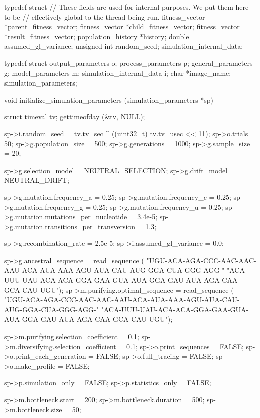 \documentclass{article}
\begin{document}
\begin{ccode}
typedef struct {
  // These fields are used for internal purposes. We put them here to be
  // effectively global to the thread being run.
  fitness_vector	*parent_fitness_vector;
  fitness_vector	*child_fitness_vector;
  fitness_vector	*result_fitness_vector;
  population_history	*history;
  double		assumed_gl_variance;
  unsigned int		random_seed;
} simulation_internal_data;

typedef struct {
  output_parameters		o;
  process_parameters		p;
  general_parameters		g;
  model_parameters		m;
  simulation_internal_data	i;
  char				*image_name;
} simulation_parameters;

void initialize_simulation_parameters (simulation_parameters *sp) {
  struct timeval tv;
  gettimeofday (&tv, NULL);

  sp->i.random_seed                     	= tv.tv_sec ^ ((uint32_t) tv.tv_usec << 11);
  sp->o.trials                     		= 50;
  sp->g.population_size				= 500;
  sp->g.generations				= 1000;
  sp->g.sample_size				= 20;

  sp->g.selection_model				= NEUTRAL_SELECTION;
  sp->g.drift_model				= NEUTRAL_DRIFT;

  sp->g.mutation.frequency_a			= 0.25;
  sp->g.mutation.frequency_c			= 0.25;
  sp->g.mutation.frequency_g			= 0.25;
  sp->g.mutation.frequency_u			= 0.25;
  sp->g.mutation.mutations_per_nucleotide	= 3.4e-5;
  sp->g.mutation.transitions_per_transversion	= 1.3;

  sp->g.recombination_rate			= 2.5e-5;
  sp->i.assumed_gl_variance			= 0.0;

  sp->g.ancestral_sequence = read_sequence (
    "UGU-ACA-AGA-CCC-AAC-AAC-AAU-ACA-AUA-AAA-AGU-AUA-CAU-AUG-GGA-CUA-GGG-AGG-"
    "ACA-UUU-UAU-ACA-ACA-GGA-GAA-GUA-AUA-GGA-GAU-AUA-AGA-CAA-GCA-CAU-UGU");
  sp->m.purifying.optimal_sequence = read_sequence (
    "UGU-ACA-AGA-CCC-AAC-AAC-AAU-ACA-AUA-AAA-AGU-AUA-CAU-AUG-GGA-CUA-GGG-AGG-"
    "ACA-UUU-UAU-ACA-ACA-GGA-GAA-GUA-AUA-GGA-GAU-AUA-AGA-CAA-GCA-CAU-UGU");

  sp->m.purifying.selection_coefficient		= 0.1;
  sp->m.diversifying.selection_coefficient	= 0.1;
  sp->o.print_sequences				= FALSE;
  sp->o.print_each_generation			= FALSE;
  sp->o.full_tracing				= FALSE;
  sp->o.make_profile				= FALSE;

  sp->p.simulation_only				= FALSE;
  sp->p.statistics_only				= FALSE;

  sp->m.bottleneck.start			= 200;
  sp->m.bottleneck.duration			= 500;
  sp->m.bottleneck.size				= 50;

}
\end{ccode}
\end{document}
